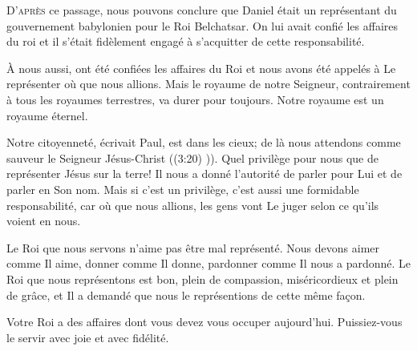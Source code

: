 \dvrule






\lettrine{D}{'après} ce passage,
 nous pouvons conclure que Daniel était un représentant du gouvernement
 babylonien pour le Roi Belchatsar. On lui avait confié
 les affaires du roi et il s'était fidèlement engagé
 à s'acquitter de cette responsabilité. 

À nous aussi, ont été confiées les affaires du Roi et nous avons été appelés
 à Le représenter où que nous allions. Mais le royaume de notre Seigneur,
 contrairement à tous les royaumes terrestres, 
 va durer pour toujours.  Notre royaume est un royaume éternel. 


\Og Notre citoyenneté, écrivait Paul, 
 est dans les cieux; de là nous attendons comme sauveur
 le Seigneur Jésus-Christ \Fg{} ((3:20) \NBS)).
 Quel privilège pour nous que de représenter Jésus sur la terre!
 Il nous a donné l'autorité de parler pour Lui et de parler en Son nom.
 Mais si c'est un privilège, c'est aussi une formidable responsabilité,
 car où que nous allions, les gens vont Le juger selon ce qu'ils voient en nous. 

Le Roi que nous servons n'aime pas être mal représenté.
 Nous devons aimer comme Il aime, donner comme Il donne, pardonner
 comme Il nous a pardonné. Le Roi que nous représentons est bon,
 plein de compassion, miséricordieux et plein de grâce,
 et Il a demandé que nous le représentions de cette même fa\c{c}on. 

Votre Roi a des affaires dont vous devez vous occuper aujourd'hui.
 Puissiez-vous le servir avec joie et avec fidélité. 

